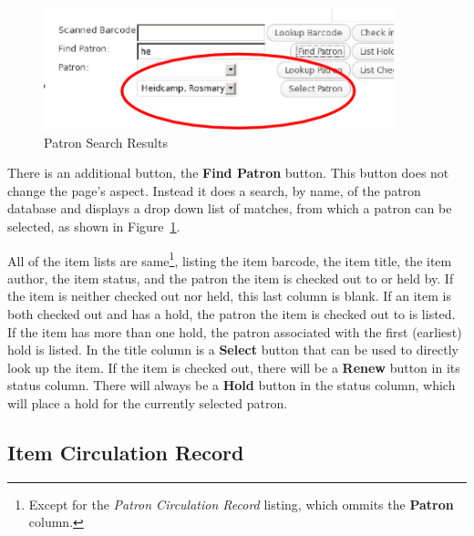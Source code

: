 \documentclass[letterpaper,twoside]{article}
\begin{document}
\begin{figure}[htbp]
\begin{centering}
\includegraphics[width=4in]{FindPatron.png}
\caption{Patron Search Results}
\label{fig:FindPatron}
\end{centering}
\end{figure}
There is an additional button, the \textbf{Find Patron} button.  This
button does not change the page's aspect.  Instead it does a search, by
name, of the patron database and displays a drop down list of matches,
from which a patron can be selected, as shown in
Figure~\ref{fig:FindPatron}. 

All of the item lists are same\footnote{Except for the \textit{Patron
Circulation Record} listing, which ommits the \textbf{Patron} column.},
listing the item barcode, the item title, the item author, the item
status, and the patron the item is checked out to or held by. If the
item is neither checked out nor held, this last column is blank.  If an
item is both checked out and has a hold, the patron the item is checked
out to is listed.  If the item has more than one hold, the patron
associated with the first (earliest) hold is listed.  In the title
column is a \textbf{Select} button that can be used to directly look up
the item.  If the item is checked out, there will be a \textbf{Renew}
button in its status column.  There will always be a \textbf{Hold}
button in the status column, which will place a hold for the currently
selected patron.

\subsection{Item Circulation Record}
\label{sect:ItemCirculationRecord}
\end{document}
